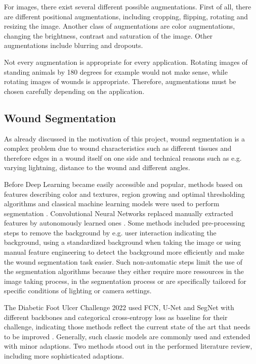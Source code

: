 For images, there exist several different possible augmentations. First of all, there are different positional augmentations, including cropping, flipping, rotating and resizing the image. Another class of augmentations are color augmentations, changing the brightness, contrast and saturation of the image. Other augmentations include blurring and dropouts.

Not every augmentation is appropriate for every application. Rotating images of standing animals by 180 degrees for example would not make sense, while rotating images of wounds is appropriate. Therefore, augmentations must be chosen carefully depending on the application.




\subsection{Wound Segmentation}


As already discussed in the motivation of this project, wound segmentation is a complex problem due to wound characteristics such as different tissues and therefore edges in a wound itself on one side and technical reasons such as e.g. varying lightning, distance to the wound and different angles. 

Before Deep Learning became easily accessible and popular, methods based on features describing color and textures, region growing and optimal thresholding algorithms and classical machine learning models were used to perform segmentation \cite{Scebba2022}. Convolutional Neural Networks replaced manually extracted features by autonomously learned ones \cite{Scebba2022}. Some methods included pre-processing steps to remove the background by e.g. user interaction indicating the background, using a standardized background when taking the image or using manual feature engineering to detect the background more efficiently and make the wound segmentation task easier. Such non-automatic steps limit the use of the segmentation algorithms because they either require more ressources in the image taking process, in the segmentation process or are specifically tailored for specific conditions of lighting or camera settings.

The Diabetic Foot Ulcer Challenge 2022 used FCN, U-Net and SegNet with different backbones and categorical cross-entropy loss as baseline for their challenge, indicating those methods reflect the current state of the art that needs to be improved \cite{DFUC2022}. Generally, such classic models are commonly used and extended with minor adaptions. Two methods stood out in the performed literature review, including more sophisticated adaptions.

